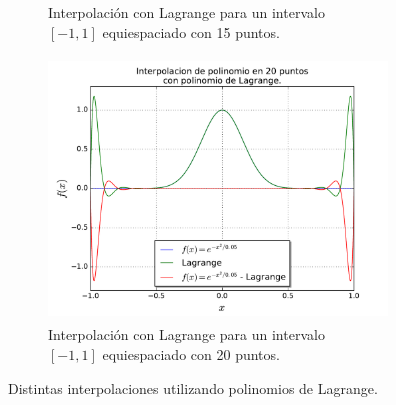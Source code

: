 \documentclass[a4paper, 11pt, spanish]{article}
\begin{document}
\begin{figure}[!hbpt]
\begin{subfigure}{.5\textwidth}
  \caption{Interpolaci\'on con Lagrange para un intervalo\\ $[-1,1]$ equiespaciado con 15 puntos.}
\end{subfigure}%
\begin{subfigure}{.5\textwidth}
  \centering
  \includegraphics[width=9cm, height=7cm]{img/lagrange20.pdf}
  \caption{Interpolaci\'on con Lagrange para un intervalo\\ $[-1,1]$ equiespaciado con 20 puntos.}
\end{subfigure}
\caption{Distintas interpolaciones utilizando polinomios de Lagrange.}
\end{figure}
\end{document}
